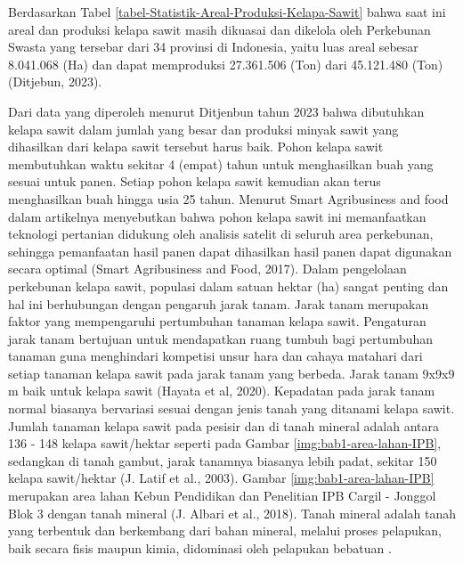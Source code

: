 Berdasarkan Tabel \ref{tabel-Statistik-Areal-Produksi-Kelapa-Sawit} bahwa saat ini areal dan produksi kelapa sawit masih dikuasai dan dikelola oleh Perkebunan Swasta yang tersebar dari 34 provinsi di Indonesia, yaitu luas areal sebesar 8.041.068 (Ha) dan dapat memproduksi 27.361.506 (Ton) dari 45.121.480 (Ton) (Ditjebun, 2023).

Dari data yang diperoleh menurut Ditjenbun tahun 2023 bahwa dibutuhkan kelapa sawit dalam jumlah yang besar dan produksi minyak sawit yang dihasilkan dari kelapa sawit tersebut harus baik. Pohon kelapa sawit membutuhkan waktu sekitar 4 (empat) tahun untuk menghasilkan buah yang sesuai untuk panen. Setiap pohon kelapa sawit kemudian akan terus menghasilkan buah hingga usia 25 tahun. Menurut Smart Agribusiness and food dalam artikelnya menyebutkan bahwa pohon kelapa sawit ini memanfaatkan teknologi pertanian didukung oleh analisis satelit di seluruh area perkebunan, sehingga pemanfaatan hasil panen dapat dihasilkan hasil panen dapat digunakan secara optimal (Smart Agribusiness and Food, 2017). Dalam pengelolaan perkebunan kelapa sawit, populasi dalam satuan hektar (ha) sangat penting dan hal ini berhubungan dengan pengaruh jarak tanam. Jarak tanam merupakan faktor yang mempengaruhi pertumbuhan tanaman kelapa sawit. Pengaturan jarak tanam bertujuan untuk mendapatkan ruang tumbuh bagi pertumbuhan tanaman guna menghindari kompetisi unsur hara dan cahaya matahari dari setiap tanaman kelapa sawit pada jarak tanam yang berbeda. Jarak tanam 9x9x9 m baik untuk kelapa sawit (Hayata et al, 2020). Kepadatan pada jarak tanam normal biasanya bervariasi sesuai dengan jenis tanah yang ditanami kelapa sawit. Jumlah tanaman kelapa sawit pada pesisir dan di tanah mineral adalah antara 136 - 148 kelapa sawit/hektar seperti pada Gambar \ref{img:bab1-area-lahan-IPB}, sedangkan di tanah gambut, jarak tanamnya biasanya lebih padat, sekitar 150 kelapa sawit/hektar (J. Latif et al., 2003). Gambar \ref{img:bab1-area-lahan-IPB} merupakan area lahan Kebun Pendidikan dan Penelitian IPB Cargil - Jonggol Blok 3 dengan tanah mineral (J. Albari et al., 2018). Tanah mineral adalah tanah yang terbentuk dan berkembang dari bahan mineral, melalui proses pelapukan, baik secara fisis maupun kimia, didominasi oleh pelapukan bebatuan \citep{Mineral-Water-Sebagai-Indikator}.

